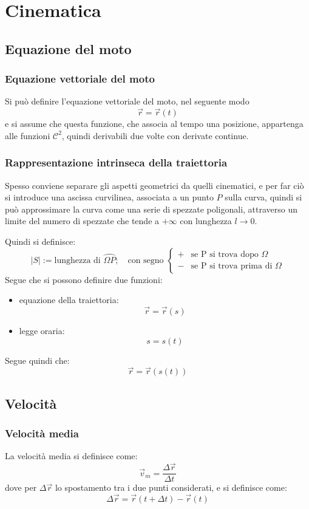 \documentclass[11pt, a4paper, openright]{book}
\theoremstyle{plain}
\theoremstyle{definition}
\begin{document}
\chapter{Cinematica}
\section{Equazione del moto}
\subsection{Equazione vettoriale del moto}
Si può definire l'equazione vettoriale del moto, nel seguente modo
\[\vec{r} = \vec{r}(t)\]
e si assume che questa funzione, che associa al tempo una posizione, appartenga alle funzioni $\mathcal{C}^2$, quindi derivabili due volte con derivate continue.
\subsection{Rappresentazione intrinseca della traiettoria}
Spesso conviene separare gli aspetti geometrici da quelli cinematici, e per far ciò si introduce una ascissa curvilinea, associata a un punto $P$ sulla curva, quindi si può approssimare la curva come una serie di spezzate poligonali, attraverso un limite del numero di spezzate che tende a $+\infty$ con lunghezza $l \rightarrow 0$.

Quindi si definisce:
\[|S| := \text{lunghezza di } \wideparen{\Omega P}; \quad \text{con segno } \begin{cases}
    + & \text{se P si trova dopo $\Omega$} \\
    - & \text{se P si trova prima di $\Omega$}
\end{cases}
\]
Segue che si possono definire due funzioni:
\begin{itemize}
    \item equazione della traiettoria:
    \[\vec{r} = \vec{r}(s)\]
    \item legge oraria:
    \[s = s(t)\]
\end{itemize}
Segue quindi che:
\[\vec{r} = \vec{r}(s(t))\]

\newpage

\section{Velocità}
\subsection{Velocità media}
La velocità media si definisce come:
\[\vec{v}_m = \frac{\Delta \vec{r}}{\Delta t}\]
dove per $\Delta \vec{r}$ lo spostamento tra i due punti considerati, e si definisce come:
\[\Delta \vec{r} = \vec{r}(t + \Delta t) - \vec{r}(t)\]
\end{document}

